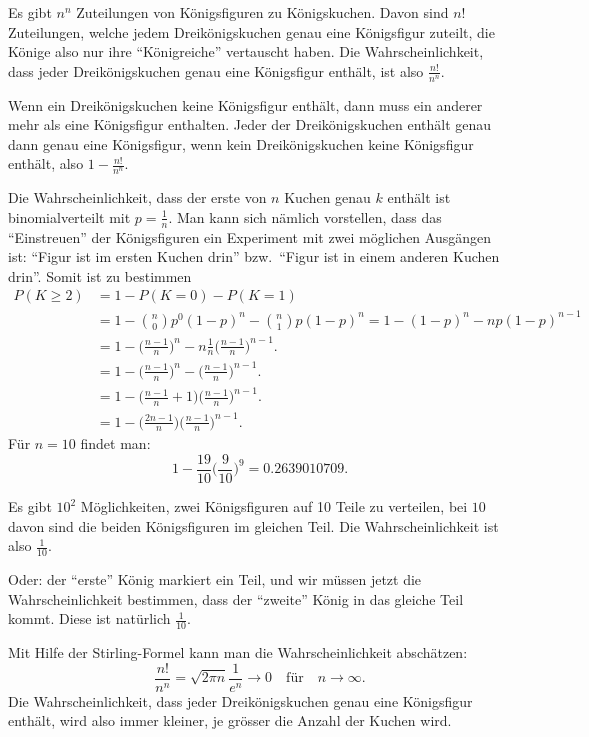\begin{loesung}
\begin{teilaufgaben}
\item Es gibt $n^n$ Zuteilungen von Königsfiguren zu Königskuchen.
Davon sind $n!$ Zuteilungen, welche jedem Dreikönigskuchen genau eine
Königsfigur zuteilt, die Könige also nur ihre ``Königreiche''
vertauscht haben. Die Wahrscheinlichkeit, dass jeder Dreikönigskuchen
genau eine Königsfigur enthält, ist also
$\frac{n!}{n^n}$.
\item Wenn ein Dreikönigskuchen keine Königsfigur enthält, dann muss
ein anderer mehr als eine Königsfigur enthalten.
Jeder der Dreikönigskuchen enthält genau dann genau eine Königsfigur, wenn
kein Dreikönigskuchen keine Königsfigur enthält, also $1-\frac{n!}{n^n}$.
\item Die Wahrscheinlichkeit, dass der erste von $n$ Kuchen genau $k$
enthält ist binomialverteilt mit $p=\frac1{n}$. Man kann sich nämlich
vorstellen, dass das ``Einstreuen'' der Königsfiguren ein Experiment
mit zwei möglichen Ausgängen ist: ``Figur ist im ersten Kuchen drin''
bzw.~``Figur ist in einem anderen Kuchen drin''. Somit ist zu bestimmen
\begin{align*}
P(K\ge 2)
&=
1 -P(K=0) - P(K=1)
\\
&=
1 - \binom{n}{0}p^0(1-p)^n
- \binom{n}{1}p(1-p)^n
=
1 - (1-p)^n - np(1-p)^{n-1}
\\
&=
1 - \biggl(\frac{n-1}{n}\biggr)^n
- n\frac1{n}\biggl(\frac{n-1}{n}\biggr)^{n-1}.
\\
&=
1 - \biggl(\frac{n-1}{n}\biggr)^n
- \biggl(\frac{n-1}{n}\biggr)^{n-1}.
\\
&=
1 - \biggl(\frac{n-1}{n}+1\biggr) \biggl(\frac{n-1}{n}\biggr)^{n-1}.
\\
&=
1 - \biggl(\frac{2n-1}{n}\biggr) \biggl(\frac{n-1}{n}\biggr)^{n-1}.
\end{align*}
Für $n=10$ findet man:
\[
1-\frac{19}{10}\biggl(\frac{9}{10}\biggr)^9
=
0.2639010709.
\]
\item Es gibt $10^2$ Möglichkeiten, zwei Königsfiguren auf 10 Teile
zu verteilen, bei $10$ davon sind die beiden Königsfiguren im gleichen
Teil. Die Wahrscheinlichkeit ist also $\frac1{10}$.

Oder: der ``erste'' König markiert ein Teil, und wir müssen jetzt
die Wahrscheinlichkeit bestimmen, dass der ``zweite'' König in
das gleiche Teil kommt. Diese ist natürlich $\frac1{10}$.
\qedhere
\end{teilaufgaben}
\end{loesung}

\begin{diskussion}
Mit Hilfe der Stirling-Formel kann man die Wahrscheinlichkeit abschätzen:
\[
\frac{n!}{n^n}
=
\sqrt{2\pi n}\frac1{e^n}\to0\quad\text{für}\quad n\to\infty.
\]
Die Wahrscheinlichkeit, dass jeder Dreikönigskuchen genau eine Königsfigur
enthält, wird also immer kleiner, je grösser die Anzahl der Kuchen wird.
\end{diskussion}

